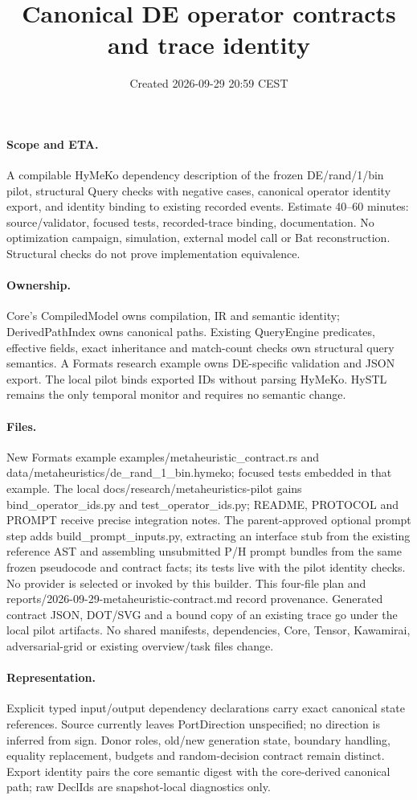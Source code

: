 \documentclass[11pt,a4paper]{article}
\title{Canonical DE operator contracts and trace identity}
\date{Created 2026-09-29 20:59 CEST}
\begin{document}
\maketitle
\paragraph{Scope and ETA.} A compilable HyMeKo dependency description of the frozen
DE/rand/1/bin pilot, structural Query checks with negative cases, canonical
operator identity export, and identity binding to existing recorded events.
Estimate 40--60 minutes: source/validator, focused tests, recorded-trace binding,
documentation. No optimization campaign, simulation, external model call or Bat
reconstruction. Structural checks do not prove implementation equivalence.
\paragraph{Ownership.} Core's CompiledModel owns compilation, IR and semantic
identity; DerivedPathIndex owns canonical paths. Existing QueryEngine predicates,
effective fields, exact inheritance and match-count checks own structural query
semantics. A Formats research example owns DE-specific validation and JSON export.
The local pilot binds exported IDs without parsing HyMeKo. HySTL remains the only
temporal monitor and requires no semantic change.
\paragraph{Files.} New Formats example examples/metaheuristic\_contract.rs and
data/metaheuristics/de\_rand\_1\_bin.hymeko; focused tests embedded in that example.
The local docs/research/metaheuristics-pilot gains bind\_operator\_ids.py and
test\_operator\_ids.py; README, PROTOCOL and PROMPT receive precise integration notes.
The parent-approved optional prompt step adds build\_prompt\_inputs.py, extracting
an interface stub from the existing reference AST and assembling unsubmitted P/H
prompt bundles from the same frozen pseudocode and contract facts; its tests live
with the pilot identity checks. No provider is selected or invoked by this builder.
This four-file plan and reports/2026-09-29-metaheuristic-contract.md record provenance.
Generated contract JSON, DOT/SVG and a bound copy of an existing trace go under
the local pilot artifacts. No shared manifests, dependencies, Core, Tensor,
Kawamirai, adversarial-grid or existing overview/task files change.
\paragraph{Representation.} Explicit typed input/output dependency declarations
carry exact canonical state references. Source currently leaves PortDirection
unspecified; no direction is inferred from sign. Donor roles, old/new generation
state, boundary handling, equality replacement, budgets and random-decision
contract remain distinct. Export identity pairs the core semantic digest with the
core-derived canonical path; raw DeclIds are snapshot-local diagnostics only.
\end{document}
